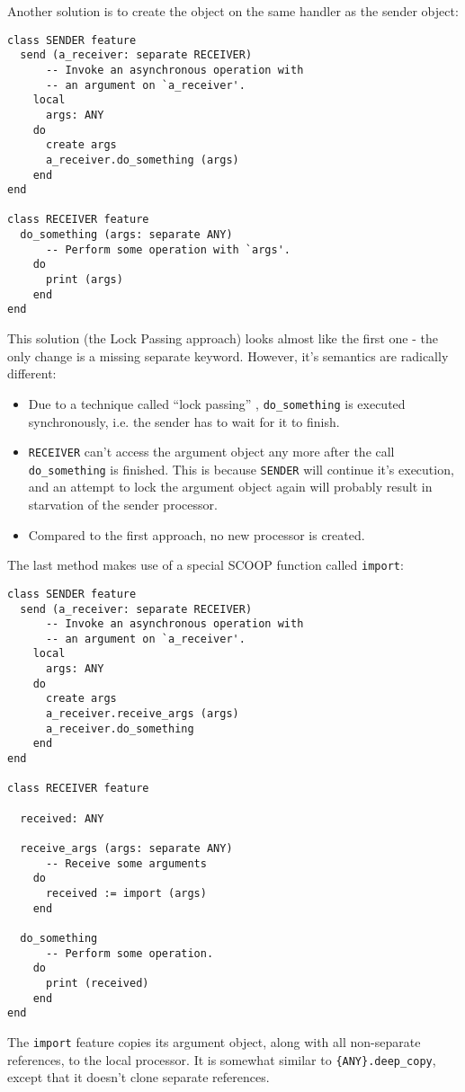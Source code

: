 \documentclass[a4paper,10pt]{report}
\begin{document}
Another solution is to create the object on the same handler as the sender object:
\begin{lstlisting}
class SENDER feature
  send (a_receiver: separate RECEIVER)
      -- Invoke an asynchronous operation with
      -- an argument on `a_receiver'.
    local
      args: ANY
    do
      create args
      a_receiver.do_something (args)
    end
end

class RECEIVER feature 
  do_something (args: separate ANY)
      -- Perform some operation with `args'.
    do
      print (args)
    end
end
\end{lstlisting}
This solution (the Lock Passing approach) looks almost like the first one - the only change is a missing separate keyword.
However, it's semantics are radically different:

\begin{itemize}
 \item Due to a technique called ``lock passing'' , \lstinline!do_something! is executed synchronously, i.e. the sender has to wait for it to finish.
 \item \lstinline!RECEIVER! can't access the argument object any more after the call \lstinline!do_something! is finished.
 This is because \lstinline!SENDER! will continue it's execution, and an attempt to lock the argument object again will probably result in starvation of the sender processor.
 \item Compared to the first approach, no new processor is created.
\end{itemize}

The last method makes use of a special SCOOP function called \lstinline!import!:
\begin{lstlisting}
class SENDER feature
  send (a_receiver: separate RECEIVER)
      -- Invoke an asynchronous operation with
      -- an argument on `a_receiver'.
    local
      args: ANY
    do
      create args
      a_receiver.receive_args (args)
      a_receiver.do_something
    end
end

class RECEIVER feature
  
  received: ANY
  
  receive_args (args: separate ANY)
      -- Receive some arguments
    do
      received := import (args)
    end

  do_something
      -- Perform some operation.
    do
      print (received)
    end
end
\end{lstlisting}
The \lstinline!import! feature copies its argument object, along with all non-separate references, to the local processor.
It is somewhat similar to \lstinline!{ANY}.deep_copy!, except that it doesn't clone separate references.
\end{document}
